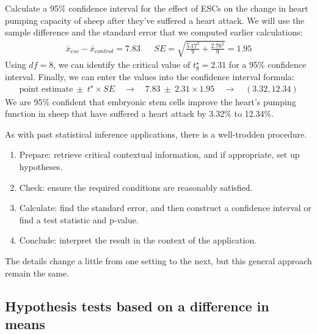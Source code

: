 \begin{examplewrap}
\begin{nexample}{Calculate a 95\% confidence interval for the
    effect of ESCs on the change in heart pumping capacity of
    sheep after they've suffered a heart attack.}
  We will use the sample difference and the standard error that 
  we computed earlier calculations:
  \begin{align*}
  \bar{x}_{esc} - \bar{x}_{control} = 7.83
  && SE = \sqrt{\frac{5.17^2}{9} + \frac{2.76^2}{9}} = 1.95
  \end{align*}
  Using $df = 8$, we can identify the
  critical value of $t^{\star}_{8} = 2.31$
  for a 95\% confidence interval.
  Finally, we can enter the values into the confidence
  interval formula:
  \begin{align*}
  \text{point estimate} \ \pm\ t^{\star} \times SE
    \quad\rightarrow\quad 7.83 \ \pm\ 2.31\times 1.95
    \quad\rightarrow\quad (3.32, 12.34)
  \end{align*}
  We are 95\% confident that embryonic stem cells improve
  the heart's pumping function in sheep that have suffered
  a heart attack by 3.32\% to 12.34\%.
\end{nexample}
\end{examplewrap}


\noindent%
As with past statistical inference applications,
there is a well-trodden procedure.
\begin{enumerate}
\setlength{\itemsep}{0mm}
\item Prepare: retrieve critical contextual information,
    and if appropriate, set up hypotheses.
\item Check: ensure the required conditions are reasonably
    satisfied.
\item Calculate: find the standard error, and then construct
    a confidence interval or find a test statistic and p-value.
\item Conclude: interpret the result in the context of the
    application.
\end{enumerate}
The details change a little from one setting to the next,
but this general approach remain the same.


\D{\newpage}

\subsection{Hypothesis tests based on a difference in means}

